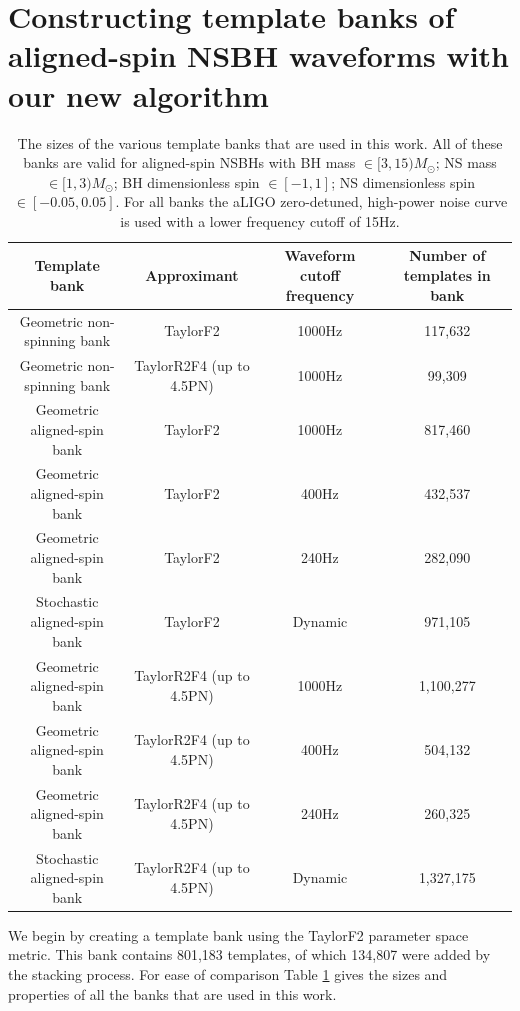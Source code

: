 \section{Constructing template banks of aligned-spin NSBH waveforms with our 
new algorithm}
\label{sec:bank_construction}

\begin{table}
    \centering
    \begin{minipage}[l]{\columnwidth}
    \centering
    \begin{adjustbox}{width=1\textwidth}
\begin{tabular}{c | c | c | c}
 Template bank & Approximant & Waveform cutoff frequency & Number of templates
in bank \\ \hline \hline
 Geometric non-spinning bank & TaylorF2 & 1000Hz & 117,632 \\
 Geometric non-spinning bank & TaylorR2F4 (up to 4.5PN) & 1000Hz & 99,309 \\
 Geometric aligned-spin bank & TaylorF2 & 1000Hz & 817,460 \\
 Geometric aligned-spin bank & TaylorF2 & 400Hz & 432,537 \\
 Geometric aligned-spin bank & TaylorF2 & 240Hz & 282,090 \\
 Stochastic aligned-spin bank & TaylorF2 & Dynamic & 971,105 \\
 Geometric aligned-spin bank & TaylorR2F4 (up to 4.5PN) & 1000Hz & 1,100,277 \\
 Geometric aligned-spin bank & TaylorR2F4 (up to 4.5PN) & 400Hz & 504,132 \\
 Geometric aligned-spin bank & TaylorR2F4 (up to 4.5PN) & 240Hz & 260,325 \\
 Stochastic aligned-spin bank & TaylorR2F4 (up to 4.5PN) & Dynamic & 1,327,175\\
\end{tabular}
\end{adjustbox}
\caption{\label{tab:banksizes}
The sizes of the various template banks that are used in this work. All of these
banks are valid for
aligned-spin \acp{NSBH} with BH mass $\in [3,15) M_{\odot}$; NS mass $\in 
[1,3)M_{\odot}$; BH
dimensionless spin $\in [-1,1]$;
NS dimensionless spin $\in [-0.05,0.05]$. For all banks the \ac{aLIGO}
zero-detuned, high-power noise curve is used with a lower frequency cutoff of
15Hz.
}
\end{minipage}
\end{table}

We begin by creating a template bank using the TaylorF2 parameter space metric.
This bank contains 801,183 templates, of which 134,807 were added by the stacking process. For ease of comparison Table \ref{tab:banksizes} gives the sizes and properties of
all the banks that are used in this work.

